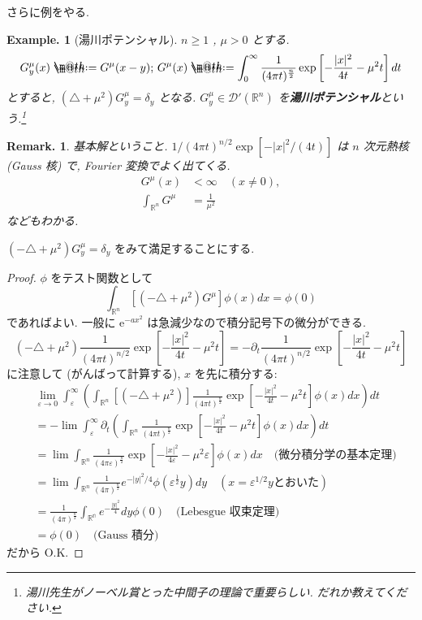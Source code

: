 \documentclass[openany, a4paper, oneside]{jsbook}
\makeatletter
\newcommand*{\defeq}{\mathrel{\rlap{%
\raisebox{0.3ex}{$\m@th\cdot$}}%
\raisebox{-0.3ex}{$\m@th\cdot$}}%
=}
\theoremstyle{break}
\theoremstyle{breakdefn}
\newtheorem{ex}[thm]{Example.}
\newtheorem{rem}[thm]{Remark.}
\newcommand{\abs}[1]{\left|#1\right|}
\newcommand{\rbk}[1]{\left (#1\right)}
\newcommand{\sqbk}[1]{\left[#1\right]}
\makeatother
\begin{document}
さらに例をやる.
\begin{ex}[湯川ポテンシャル]
 $n \ge 1$ ,  $\mu >0$ とする.
 \begin{equation}
 G_y^{\mu}(x)
 \defeq
 G^{\mu}(x - y); \,
 G^{\mu}(x)
 \defeq
 \int_0^{\infty} \frac{1}{(4\pi t)^{\frac{n}{2}}} \exp \sqbk{-\frac{|x|^2}{4t} - \mu^2t} dt
 \end{equation}
 とすると, $(\triangle + \mu^2) G_y^{\mu} = \delta_y$ となる.
 $G_y^{\mu} \in \mathcal{D}'(\mathbb{R}^n)$ を\textbf{湯川ポテンシャル}という.\footnote{湯川先生がノーベル賞とった中間子の理論で重要らしい.
だれか教えてください.
 }
\end{ex}

\begin{rem}
 基本解ということ.
 $1/ (4\pi t)^{n/2}\exp[-|x|^2/ (4t)]$ は $n$ 次元熱核 (Gauss 核) で,
 Fourier 変換でよく出てくる.
 \begin{align}
  G^{\mu}(x)
  &<
  \infty \quad (x \neq 0), \\
  \int_{\mathbb{R}^n}G^{\mu}
  &=
  \frac{1}{\mu^2}
 \end{align}
 などもわかる.
\end{rem}

$(-\triangle + \mu^2) G_y^{\mu} = \delta_y$ をみて満足することにする.
\begin{proof}
$\phi$ をテスト関数として
\begin{equation}
 \int_{\mathbb{R}^n}[(- \triangle + {\mu}^2) G^{\mu}]\phi (x) dx
 =
 \phi (0)
\end{equation}
であればよい.
一般に $\mathrm{e}^{-ax^2}$ は急減少なので積分記号下の微分ができる.
\begin{equation}
 (-\triangle + {\mu}^2)\frac{1}{(4\pi t)^{n/2}} \exp \sqbk{- \frac{|x|^2}{4t} -\mu^2t}
 =
 -\partial_t\frac{1}{(4\pi t)^{n/2}} \exp \sqbk{- \frac{|x|^2}{4t} -\mu^2t}
\end{equation}
に注意して (がんばって計算する), $x$ を先に積分する:
\begin{align}
 &\lim_{\varepsilon \to 0}
  \int_{\varepsilon}^{\infty}
  \rbk{\int_{\mathbb{R}^n}[(-\triangle + \mu^2)] \frac{1}{(4\pi t)^{\frac{n}{2}}} \exp \sqbk{- \frac{|x|^2}{4t} -\mu^2t}
  \phi (x) dx} dt \\
 &=
 -\lim \int_{\varepsilon}^{\infty}\partial_t
  \rbk{\int_{\mathbb{R}^n}\frac{1}{(4\pi t)^{\frac{n}{2}}} \exp \sqbk{- \frac{|x|^2}{4t} -\mu^2t} \phi (x) dx} dt \\
 &=
 \lim \int_{\mathbb{R}^n}
  \frac{1}{(4\pi \varepsilon)^{\frac{n}{2}}}
  \exp \sqbk{- \frac{|x|^2}{4 \varepsilon} -\mu^2 \varepsilon}
  \phi (x) dx \quad \text{(微分積分学の基本定理)} \\
 &=
 \lim \int_{\mathbb{R}^n}
  \frac{1}{(4\pi)^{\frac{n}{2}}}
  e^{- \abs{y}^2 / 4}
  \phi (\varepsilon^{\frac{1}{2}}y) dy \quad (x = \varepsilon^{1/2}y \text{とおいた}) \\
 &=
 \frac{1}{(4\pi)^{\frac{n}{2}}}\int_{\mathbb{R^n}}e^{- \frac{|y|^2}{4}}dy\phi (0) \quad \text{(Lebesgue 収束定理)} \\
 &= \phi (0) \quad \text{(Gauss 積分)}
\end{align}
だから O.K.
\end{proof}
\end{document}
